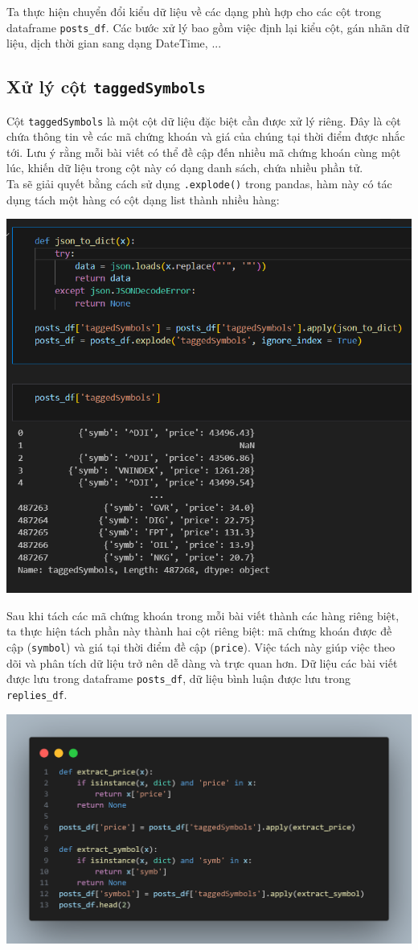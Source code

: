 Ta thực hiện chuyển đổi kiểu dữ liệu về các dạng phù hợp cho các cột trong dataframe \texttt{posts\_df}.  
Các bước xử lý bao gồm việc định lại kiểu cột, gán nhãn dữ liệu, dịch thời gian sang dạng DateTime, ...

\subsection*{Xử lý cột \texttt{taggedSymbols}}
Cột \texttt{taggedSymbols} là một cột dữ liệu đặc biệt cần được xử lý riêng. Đây là cột chứa thông tin về các mã chứng khoán và giá của chúng tại thời điểm được nhắc tới. Lưu ý rằng mỗi bài viết có thể đề cập đến nhiều mã chứng khoán cùng một lúc, khiến dữ liệu trong cột này có dạng danh sách, chứa nhiều phần tử.\\

Ta sẽ giải quyết bằng cách sử dụng \texttt{.explode()} trong pandas, hàm này có tác dụng tách một hàng có cột dạng list thành nhiều hàng:
\begin{center}
\includegraphics[width=0.7\linewidth]{images/code-3.3.png}
\end{center}

Sau khi tách các mã chứng khoán trong mỗi bài viết thành các hàng riêng biệt, ta thực hiện tách phần này thành hai cột riêng biệt: mã chứng khoán được đề cập (\texttt{symbol}) và giá tại thời điểm đề cập (\texttt{price}). Việc tách này giúp việc theo dõi và phân tích dữ liệu trở nên dễ dàng và trực quan hơn. Dữ liệu các bài viết được lưu trong dataframe \texttt{posts\_df}, dữ liệu bình luận được lưu trong \texttt{replies\_df}.

\begin{center}
\includegraphics[width=0.75\linewidth]{images/code-3.4.png}
\end{center}

